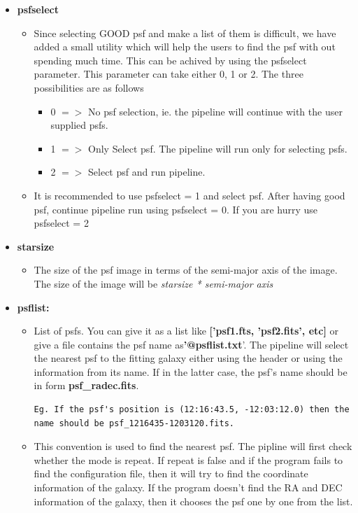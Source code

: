 \documentclass[a4paper,12pt]{article}
\begin{document}
\begin{itemize}
\item \textbf{psfselect}
\begin{itemize}
\item[] Since selecting GOOD psf and make a list of them is difficult, we have added a small utility which will help the users to find the psf with out spending much time. This can be achived by using the psfselect parameter. This parameter can take either 0, 1 or 2. The three possibilities are as follows
\begin{itemize}
\item 0 $=>$ No psf selection, ie. the pipeline will continue with the user supplied psfs.
\item 1 $=>$ Only Select psf. The pipeline will run only for selecting psfs.
\item 2 $=>$ Select psf and run pipeline.
\end{itemize}
\item[] It is recommended to use psfselect = 1 and select psf. After having
 good psf, continue pipeline run using psfselect = 0. If you are hurry
 use psfselect = 2
\end{itemize}

\item \textbf{starsize}
\begin{itemize}
\item[] The size of the psf image in terms of the semi-major axis of the image. The size of the image will be\textit{ starsize * semi-major axis}
\end{itemize}

\item \textbf{psflist:}
\begin{itemize}
\item[] List of psfs. You can give it as a list like\textbf{ ['psf1.fts, 'psf2.fits', etc]} or give a file contains the psf name as\textbf{'@psflist.txt}'. The pipeline will select the nearest psf to the fitting galaxy either using the header or using the information from its name. If in the latter case, the psf's name should be in form\textbf{
 psf\_radec.fits}.
\begin{verbatim}Eg. If the psf's position is (12:16:43.5, -12:03:12.0) then the 
name should be psf_1216435-1203120.fits.
\end{verbatim}
\item[]  This convention is used to find the nearest psf. The pipline will first check whether the mode is repeat. If repeat is false and if the program fails to find the configuration file, then it will try to find the coordinate information of the galaxy. If the program doesn't find the RA and DEC information of the galaxy, then it chooses the psf one by one from the list.
\end{itemize}


\end{itemize}
\end{document}
